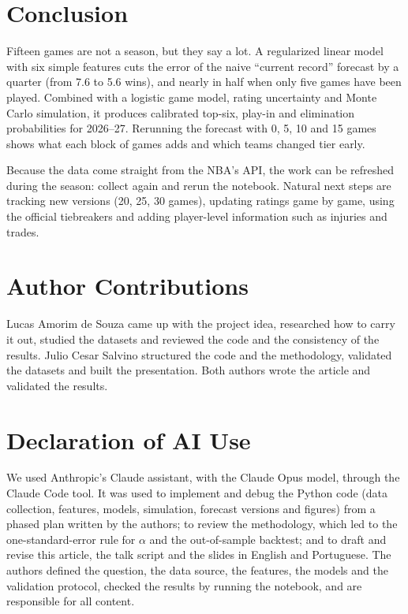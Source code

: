 \documentclass[conference]{IEEEtran}
\begin{document}
\section{Conclusion}
Fifteen games are not a season, but they say a lot. A regularized linear model with six simple features cuts the error of the naive ``current record'' forecast by a quarter (from 7.6 to 5.6 wins), and nearly in half when only five games have been played. Combined with a logistic game model, rating uncertainty and Monte Carlo simulation, it produces calibrated top-six, play-in and elimination probabilities for 2026--27. Rerunning the forecast with 0, 5, 10 and 15 games shows what each block of games adds and which teams changed tier early.

Because the data come straight from the NBA's API, the work can be refreshed during the season: collect again and rerun the notebook. Natural next steps are tracking new versions (20, 25, 30 games), updating ratings game by game, using the official tiebreakers and adding player-level information such as injuries and trades.

\section*{Author Contributions}
Lucas Amorim de Souza came up with the project idea, researched how to carry it out, studied the datasets and reviewed the code and the consistency of the results. Julio Cesar Salvino structured the code and the methodology, validated the datasets and built the presentation. Both authors wrote the article and validated the results.

\section*{Declaration of AI Use}
We used Anthropic's Claude assistant, with the Claude Opus model, through the Claude Code tool. It was used to implement and debug the Python code (data collection, features, models, simulation, forecast versions and figures) from a phased plan written by the authors; to review the methodology, which led to the one-standard-error rule for $\alpha$ and the out-of-sample backtest; and to draft and revise this article, the talk script and the slides in English and Portuguese. The authors defined the question, the data source, the features, the models and the validation protocol, checked the results by running the notebook, and are responsible for all content.
\end{document}
